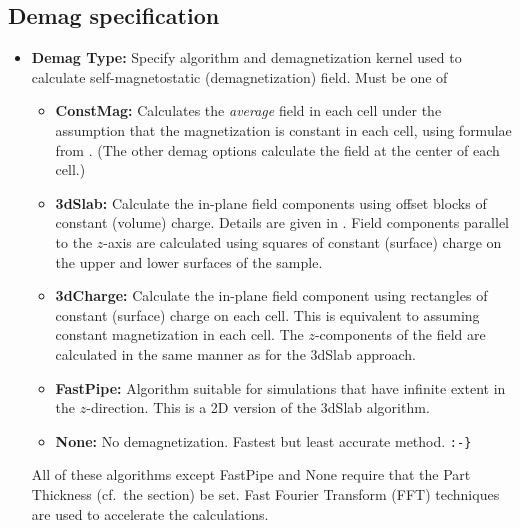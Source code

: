 \subsection{Demag specification}\label{sec:mifdemagspec}
\begin{itemize}
   \item {\bf Demag Type:} Specify algorithm and demagnetization kernel
      used to calculate self-magnetostatic
      (demagnetization) field.  Must be one of
      \begin{itemize}
         \item {\bf ConstMag:} Calculates the {\em average} field in
            each cell under the assumption that the magnetization is
            constant in each cell, using formulae from \cite{newell1993}.
            (The other demag options calculate the field at the center
            of each cell.)
         \item {\bf 3dSlab:}  Calculate the in-plane field components
            using offset blocks of constant (volume) charge.  Details
            are given in \cite{berkov1993}. Field components parallel to
            the $z$-axis are calculated using squares of constant
            (surface) charge on the upper and lower surfaces of the
            sample.
         \item {\bf 3dCharge:} Calculate the in-plane field component
            using rectangles of constant (surface) charge on each cell.
            This is equivalent to assuming constant magnetization in
            each cell.  The $z$-components of the field are calculated
            in the same manner as for the 3dSlab approach.
         \item {\bf FastPipe:} Algorithm suitable for simulations that
            have infinite extent in the $z$-direction.  This is a 2D
            version of the 3dSlab algorithm.
        \item {\bf None:} No demagnetization.  Fastest but least
            accurate method.  \verb+:-}+    %
    \end{itemize}

    All of these algorithms except FastPipe and None require that the
    Part Thickness (cf.\ the 
    section) be set.  Fast Fourier Transform (FFT) techniques
    are used to accelerate the calculations.

\end{itemize}

